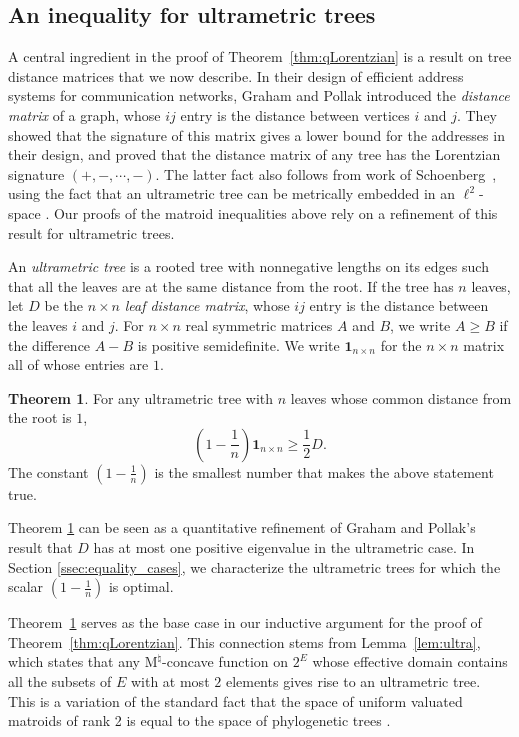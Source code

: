 \documentclass{amsart}
\theoremstyle{definition}
\newtheorem{theorem}{Theorem}[section]
\theoremstyle{remark}
\newcommand{\1}{\mathbf{1}}
\newcommand{\Mnat}{$\text{M}^\natural$}
\numberwithin{equation}{section}
\begin{document}
\subsection{An inequality for ultrametric trees}
A central ingredient in the proof of Theorem~\ref{thm:qLorentzian} is a result on tree distance matrices that we now describe.
In their design of efficient address systems for communication networks, Graham and Pollak \cite{GP71} introduced the \emph{distance matrix} of a graph, whose $ij$ entry is the distance between vertices $i$ and $j$. They showed that the signature of this matrix gives a lower bound for the addresses in their design, and proved that the distance matrix of any tree has the Lorentzian signature $(+,-,\cdots,-)$. The latter fact also follows from work of Schoenberg~\cite[Theorem 1]{Sch35}, using the fact that an ultrametric tree can be metrically embedded in an $\ell^2$-space \cite{TV83}.  Our proofs of the matroid inequalities above rely on a refinement of this result for ultrametric trees. 


An \emph{ultrametric tree} is a rooted tree with nonnegative lengths on its edges such that all the leaves are at the same distance from the root. If the tree has $n$ leaves, let $D$ be the $n \times n$ \emph{leaf distance matrix}, whose $ij$ entry
is the distance between the leaves $i$ and $j$. 
For $n \times n$ real symmetric matrices $A$ and $B$, we write $A \ge B$  if the difference $A-B$ is positive semidefinite.
We write $\1_{n\times n}$ for the $n \times n$ matrix all of whose entries are $1$.

\begin{theorem}\label{thm:psd} 
For any ultrametric tree with $n$ leaves whose common distance from the root is $1$, 
\[
\left(1 - \frac{1}{n} \right)  \1_{n\times n}  \ge \frac{1}{2}D.
\]
The constant $(1 - \frac{1}{n})$ is the smallest number that makes the above statement true.
\end{theorem}


Theorem \ref{thm:psd} can be seen as a quantitative refinement of Graham and Pollak's result that $D$ has at most one positive eigenvalue in the ultrametric case. 
In Section \ref{ssec:equality_cases}, we characterize the ultrametric trees for which the scalar $(1 - \frac1n)$ is optimal. 

Theorem~\ref{thm:psd} serves as the base case in our inductive argument for the proof of Theorem~\ref{thm:qLorentzian}.
This connection stems from Lemma~\ref{lem:ultra}, which states that any \Mnat-concave function on $2^E$ whose effective domain contains all the subsets of $E$ with at most $2$ elements gives rise to an ultrametric tree.
This is a variation of the standard fact that the space of uniform valuated matroids of rank 2 is equal to the space of phylogenetic trees \cite[Theorem 4.3.5]{MS15}. 
\end{document}
